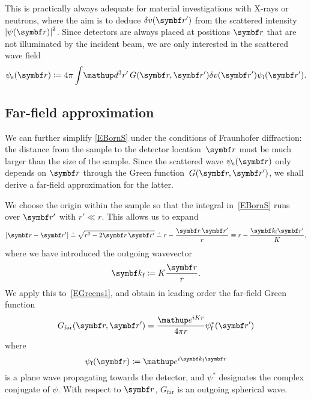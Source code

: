 This is practically always adequate for
material investigations with X-rays or neutrons,
where the aim is to
deduce $\delta v(\r')$ from the scattered intensity ${|\psi(\r)|}^2$.
Since detectors are always placed at positions $\r$
that are not illuminated by the incident beam,
we are only interested in the scattered wave field
\begin{equation}\label{EBornS}
  \psi_\text{s}(\r)
  \coloneqq
  4\pi \int\!\d^3r'\, G(\r,\r') \delta v(\r') \psi_\ti(\r').
\end{equation}
%
%

%

\subsection{Far-field approximation}

%

We can further simplify \cref{EBornS}
under the conditions of Fraunhofer diffraction:
%
the distance from the sample to the detector location~$\r$
must be much larger than the size of the sample.
Since the scattered wave $\psi_\text{s}(\r)$
only depends on $\r$ through the Green function~$G(\r,\r')$,
we shall derive a far-field approximation for the latter.

We choose the origin within the sample
so that the integral in~\cref{EBornS} runs over $\r'$ with $r'\ll r$.
This allows us to expand
\begin{equation}
  \left|\r-\r'\right|
  \doteq \sqrt{r^2-2\r\,\r'}
  \doteq r - \frac{\r\,\r'}{r}
  \equiv r - \frac{\k_\tf \r'}{K},
\end{equation}
%
%
where we have introduced the outgoing wavevector
\begin{equation}
  \k_\tf\coloneqq K\frac{\r}{r}.
\end{equation}
We apply this to~\cref{EGreens1},
%
and obtain in leading order the far-field Green function
\begin{equation}\label{EGreenFar}
  G_\text{far}(\r,\r')
  = \frac{\e^{iKr}}{4\pi r}\psi^*_\tf(\r')
\end{equation}
%
where
\begin{equation}
  \psi_\tf(\r) \coloneqq  \e^{i\k_\tf \r}
\end{equation}
%
is a plane wave propagating towards the detector,
and $\psi^*$ designates the complex conjugate of $\psi$.
With respect to $\r$, $G_\text{far}$ is an outgoing spherical wave.

